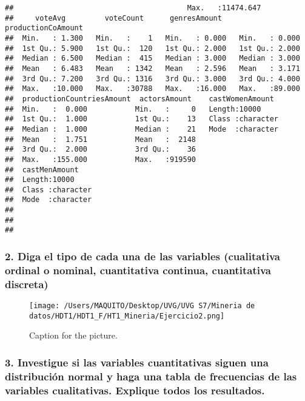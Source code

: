 \documentclass[
]{article}
\begin{document}
\begin{verbatim}
##                                        Max.   :11474.647                     
##     voteAvg         voteCount      genresAmount    productionCoAmount
##  Min.   : 1.300   Min.   :    1   Min.   : 0.000   Min.   : 0.000    
##  1st Qu.: 5.900   1st Qu.:  120   1st Qu.: 2.000   1st Qu.: 2.000    
##  Median : 6.500   Median :  415   Median : 3.000   Median : 3.000    
##  Mean   : 6.483   Mean   : 1342   Mean   : 2.596   Mean   : 3.171    
##  3rd Qu.: 7.200   3rd Qu.: 1316   3rd Qu.: 3.000   3rd Qu.: 4.000    
##  Max.   :10.000   Max.   :30788   Max.   :16.000   Max.   :89.000    
##  productionCountriesAmount  actorsAmount    castWomenAmount   
##  Min.   :  0.000           Min.   :     0   Length:10000      
##  1st Qu.:  1.000           1st Qu.:    13   Class :character  
##  Median :  1.000           Median :    21   Mode  :character  
##  Mean   :  1.751           Mean   :  2148                     
##  3rd Qu.:  2.000           3rd Qu.:    36                     
##  Max.   :155.000           Max.   :919590                     
##  castMenAmount     
##  Length:10000      
##  Class :character  
##  Mode  :character  
##                    
##                    
## 
\end{verbatim}

\hypertarget{diga-el-tipo-de-cada-una-de-las-variables-cualitativa-ordinal-o-nominal-cuantitativa-continua-cuantitativa-discreta}{%
\subsubsection{2. Diga el tipo de cada una de las variables (cualitativa
ordinal o nominal, cuantitativa continua, cuantitativa
discreta)}\label{diga-el-tipo-de-cada-una-de-las-variables-cualitativa-ordinal-o-nominal-cuantitativa-continua-cuantitativa-discreta}}

\begin{figure}
\centering
\texttt{[image: /Users/MAQUITO/Desktop/UVG/UVG S7/Mineria de datos/HDT1/HDT1\_F/HT1\_Mineria/Ejercicio2.png]}
\caption{Caption for the picture.}
\end{figure}

\hypertarget{investigue-si-las-variables-cuantitativas-siguen-una-distribuciuxf3n-normal-y-haga-una-tabla-de-frecuencias-de-las-variables-cualitativas.-explique-todos-los-resultados.}{%
\subsubsection{3. Investigue si las variables cuantitativas siguen una
distribución normal y haga una tabla de frecuencias de las variables
cualitativas. Explique todos los
resultados.}\label{investigue-si-las-variables-cuantitativas-siguen-una-distribuciuxf3n-normal-y-haga-una-tabla-de-frecuencias-de-las-variables-cualitativas.-explique-todos-los-resultados.}}
\end{document}
